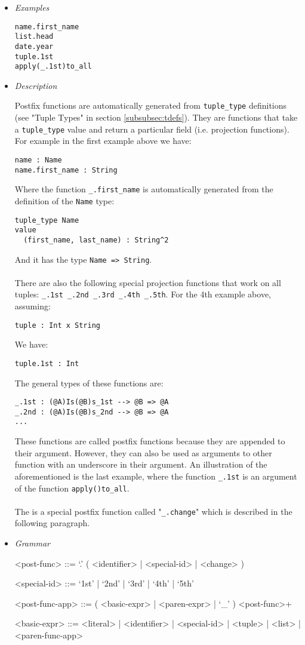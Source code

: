 \documentclass{article}
\begin{document}
\begin{itemize}

\item \textit{Examples}
\begin{verbatim}
name.first_name
list.head
date.year
tuple.1st
apply(_.1st)to_all
\end{verbatim}

\item \textit{Description} 

Postfix functions are automatically generated from \texttt{tuple_type}
definitions (see "Tuple Types" in section \ref{subsubsec:tdefs}). They are
functions that take a \texttt{tuple_type} value and return a particular field
(i.e. projection functions). For example in the first example above we have:
\begin{verbatim}
name : Name
name.first_name : String
\end{verbatim}
Where the function \texttt{_.first_name} is automatically generated from the
definition of the \texttt{Name} type:
\begin{verbatim}
tuple_type Name
value
  (first_name, last_name) : String^2
\end{verbatim}
And it has the type \texttt{Name => String}.
\\\\
There are also the following special projection functions that work on all tuples:
\texttt{_.1st _.2nd _.3rd _.4th _.5th}.
For the 4th example above, assuming:
\begin{verbatim}
tuple : Int x String
\end{verbatim}
We have:
\begin{verbatim}
tuple.1st : Int
\end{verbatim}
The general types of these functions are:
\begin{verbatim}
_.1st : (@A)Is(@B)s_1st --> @B => @A
_.2nd : (@A)Is(@B)s_2nd --> @B => @A
...
\end{verbatim}
These functions are called postfix functions because they are appended to their
argument. However, they can also be used as arguments to other function with an
underscore in their argument.  An illustration of the aforementioned is the
last example, where the function \texttt{_.1st} is an argument of the function
\texttt{apply()to_all}.
\\\\
The is a special postfix function called "\texttt{_.change}" which is described in
the following paragraph.

\item \textit{Grammar}
\begin{grammar}
<post-func> ::= `.' ( <identifier> | <special-id> | <change> )

<special-id> ::= `1st' | `2nd' | `3rd' | `4th' | `5th'

<post-func-app> ::= ( <basic-expr> | <paren-expr> | `_' ) <post-func>+

<basic-expr> ::=
<literal> | <identifier> | <special-id> | <tuple> | <list> | <paren-func-app>
\end{grammar}

\end{itemize}
\end{document}
